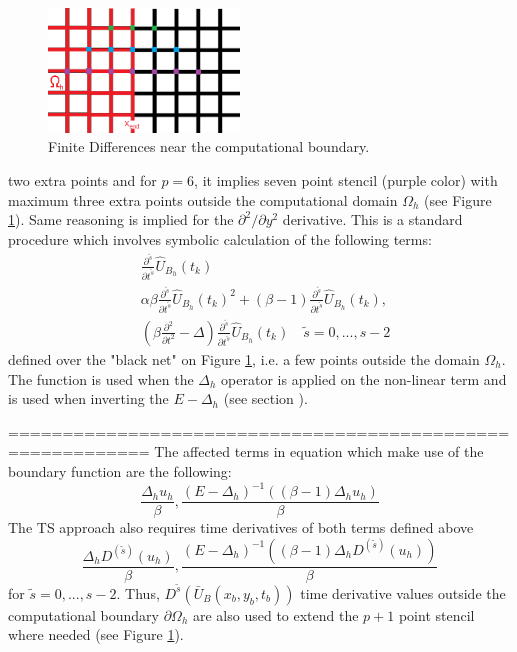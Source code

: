 \documentclass[11pt,a4paper,twoside]{article}
\begin{document}
\begin{figure}[ht]%
\begin{center}
\includegraphics[width=2in]{Pictures/BoundaryPicture.png}
	\caption{Finite Differences near the computational boundary.}
	\label{fig:BoundaryFD}
  \end{center}
\end{figure}
two extra points and for $p=6$, it implies seven point stencil (purple color) with maximum three extra points outside the computational domain $\Omega_h$ (see Figure \ref{fig:BoundaryFD}). Same reasoning is implied for the $\partial^2 / \partial y^2$ derivative. This is a standard procedure which involves symbolic calculation of the following terms:
\begin{align}
& \frac{ \partial^{\tilde s} } { \partial t^{\tilde s} } \widehat U_{B_h}(t_k)
\\
& \alpha \beta \frac{ \partial^{\tilde s} } { \partial t^{\tilde s} } \widehat U_{B_h}(t_k)^2  + (\beta -1)\frac{ \partial^{\tilde s} } { \partial t^{\tilde s} }\widehat U_{B_h}(t_k), \label{nonLinBnd}
\\
& (\beta \frac{ \partial^2 } { \partial t^2 } - \Delta)\frac{ \partial^{\tilde s} } { \partial t^{\tilde s} } \widehat U_{B_h}(t_k) \quad \tilde s = 0,...,s-2 \label{psnBnd}
\end{align}
defined over the "black net" on Figure \ref{fig:BoundaryFD}, i.e. a few points outside the domain $\Omega_h$. The function  is used when the $\Delta_h$ operator is applied on the non-linear term and  is used when inverting the $E - \Delta_h$ (see section ).
\iffalse

===========================================================
 The affected terms in equation  which make use of the boundary function  are the following:
\begin{equation*}
\frac{ \Delta_h u_h}{\beta}, \frac{ (E - \Delta_h)^{-1} ( (\beta -1)\Delta_h u_h) }{\beta}
\end{equation*}
The TS approach also requires time derivatives of both terms defined above
\begin{equation*}
\frac{ \Delta_h D^{(\tilde s)} (u_h)}{\beta}, \frac{ (E - \Delta_h)^{-1} ( (\beta -1)\Delta_h D^{(\tilde s)}(u_h) ) }{\beta}
\end{equation*}
for $\tilde s = 0, ..., s-2$.  Thus, $D^{\tilde s}(\bar U_B(x_b , y_b, t_b))$  time derivative values outside the computational boundary $\partial \Omega_h$ are also used to extend the $p+1$ point stencil where needed (see Figure  \ref{fig:BoundaryFD}). 
\end{document}
